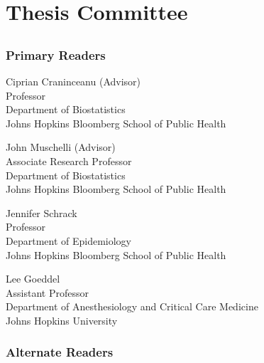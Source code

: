 \chapter*{Thesis Committee}

\section*{}
\subsection*{Primary Readers}

\begin{singlespace}


\indent Ciprian Craninceanu (Advisor)\\
\indent \indent Professor \\
\indent \indent Department of Biostatistics\\
\indent \indent  Johns Hopkins Bloomberg School of Public Health \\


\smallskip 

\noindent John Muschelli (Advisor) \\
\indent \indent Associate Research Professor\\
\indent \indent Department of Biostatistics\\
\indent \indent  Johns Hopkins Bloomberg School of Public Health \\

\smallskip 

\noindent Jennifer Schrack \\
\indent \indent Professor\\
\indent \indent Department of Epidemiology \\
\indent \indent Johns Hopkins Bloomberg School of Public Health \\

\smallskip


\noindent Lee Goeddel \\
\indent \indent Assistant Professor\\
\indent \indent Department of Anesthesiology and Critical Care Medicine\\
\indent \indent Johns Hopkins University  \\


\end{singlespace}

\subsection*{Alternate Readers}

